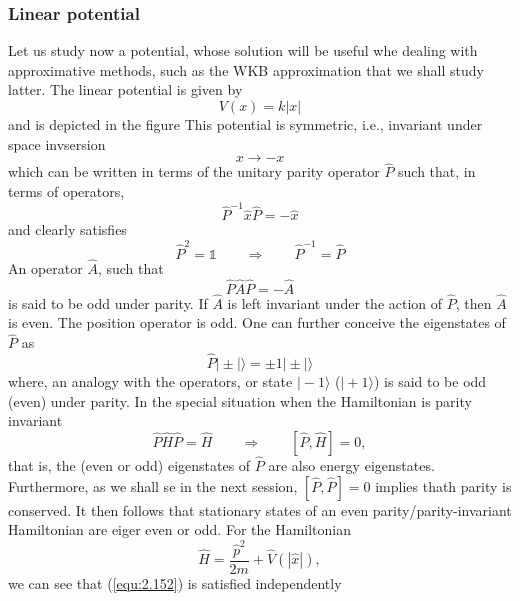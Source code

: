 \subsubsection{Linear potential}
Let us study now a potential, whose solution will be useful
whe dealing with approximative methods, such as the WKB
approximation that we shall study latter. The linear
potential is given by
\begin{equation}
  V(x) = k|x|
  \label{equ:2.149}
\end{equation}
and is depicted in the figure %
This potential is symmetric, i.e., invariant under space
invsersion
$$
x \to -x
$$
which can be written in terms of the unitary parity operator
$\hat{P}$ such that, in terms of operators,
\begin{equation}
  \hat{P}^{-1} \hat{x} \hat{P} = - \hat{x}
  \label{equ:2.150}
\end{equation}
and clearly satisfies
\begin{equation}
  \hat{P}^2 = \mathbb{1} \qquad\Rightarrow\qquad
  \hat{P}^{-1} = \hat{P}
  \label{equ:2.151}
\end{equation}
An operator $\hat{A}$, such that
\begin{equation}
  \hat{P}\hat{A}\hat{P} = -\hat{A}
  \label{equ:2.152}
\end{equation}
is said to be odd under parity. If $\hat{A}$ is left invariant
under the action of $\hat{P}$, then $\hat{A}$ is even. The
position operator is odd.
One can further conceive the eigenstates of $\hat{P}$ as
\begin{equation}
  \hat{P} \vert \pm | \rangle = \pm 1 \vert \pm | \rangle
  \label{equ:2.153}
\end{equation}
where, an analogy with the operators, or state $\vert -1
\rangle$ ($\vert + 1 \rangle$) is said to be odd (even)
under parity.
In the special situation when the Hamiltonian is parity
invariant
\begin{equation}
  \hat{P} \hat{H} \hat{P} = \hat{H} \qquad \Rightarrow \qquad
  [\hat{P}, \hat{H}] = 0,
  \label{equ:2.154}
\end{equation}
that is, the (even or odd) eigenstates of $\hat{P}$ are also
energy eigenstates.
Furthermore, as we shall se in the next session, $[\hat{P},
\hat{P}] = 0$ implies thath parity is conserved. It then
follows that stationary states of an even
parity/parity-invariant Hamiltonian are eiger even or odd.
For the Hamiltonian
$$
\hat{H} = \frac{\hat{p}^2}{2m} + \hat{V}(|\hat{x}|),
$$
we can see that (\ref{equ:2.152}) is satisfied independently
